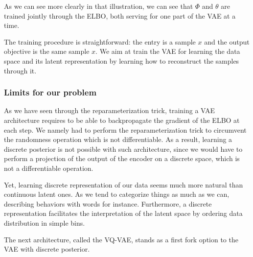 As we can see more clearly in that illustration, we can see that $\Phi$ and $\theta$ are trained jointly through the ELBO, both serving for one part of the VAE at a time.
\medskip

The training procedure is straightforward: the entry is a sample $x$ and the output objective is the same sample $x$. We aim at train the VAE for learning the data space and its latent representation by learning how to reconstruct the samples through it.

\subsubsection{Limits for our problem}

As we have seen through the reparameterization trick, training a VAE architecture requires to be able to backpropagate
the gradient of the ELBO at each step.
We namely had to perform the reparameterization trick to circumvent the randomness operation which is not differentiable.
As a result, learning a discrete posterior is not possible with such architecture, since we would have to perform a projection
of the output of the encoder on a discrete space, which is not a differentiable operation.
\medskip

Yet, learning discrete representation of our data seems much more natural than continuous latent ones.
As we tend to categorize things as much as we can, describing behaviors with words for instance.
Furthermore, a discrete representation facilitates the interpretation of the latent space by ordering data distribution in simple bins.
\medskip

The next architecture, called the VQ-VAE, stands as a first fork option to the VAE with discrete posterior.


